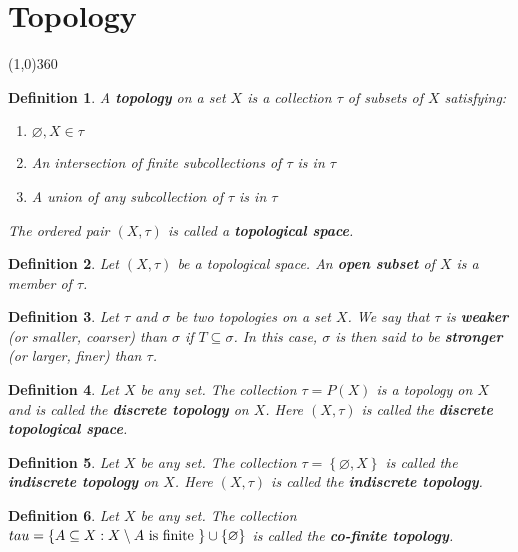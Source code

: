 \documentclass[14pt,twoside]{extreport}
\newtheorem*{defn}{Definition}
\begin{document}
\newpage
{}

\chapter*{Topology}
\line(1,0){360}

\begin{defn}
A \textbf{topology} on a set $X$ is a collection $\tau$ of subsets of $X$ satisfying:
    \begin{enumerate}
        \item $\varnothing, X \in  \tau$
        \item  An intersection of finite subcollections of $\tau$ is in $\tau$
        \item A union of any subcollection of $\tau$ is in $\tau$
    \end{enumerate}
The ordered pair $\left (X, \tau\right )$ is called a \textbf{topological space}.
\end{defn}


\begin{defn}
    Let $\left (X, \tau\right )$ be a topological space. An \textbf{open subset} of $X$ is a member of $\tau$.
\end{defn}

\begin{defn}
Let $\tau$ and $\sigma$ be two topologies on a set $X$. We say that $\tau$ is \textbf{weaker} (or smaller, coarser) than $\sigma$ if $T \subseteq \sigma$. In this case, $\sigma$ is then said to be \textbf{stronger} (or larger, finer) than $\tau$.
\end{defn}

\begin{defn}
Let $X$ be any set. The collection $\tau = P\left (X\right )$ is a topology on $X$ and is called the \textbf{discrete topology} on $X$. Here $\left (X, \tau\right )$ is called the \textbf{discrete topological space}.
\end{defn}

\begin{defn}
Let $X$ be any set. The collection $\tau = \left\{ \varnothing, X \right\}$ is called the \textbf{indiscrete topology} on $X$. Here $\left (X, \tau\right )$ is called the \textbf{indiscrete topology}.
\end{defn}

\begin{defn}
    Let $X$ be any set. The collection $\\tau = \left\{ A \subseteq X  :  X \setminus A \text{ is finite } \right\} \cup \left\{ \varnothing \right\}$ is called the \textbf{co-finite topology}.
\end{defn}
\end{document}
